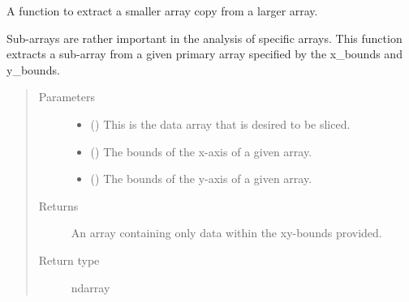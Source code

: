 \documentclass[letterpaper,10pt,english]{sphinxmanual}
\begin{document}
\begin{fulllineitems}
\label{\detokenize{python_docstrings/IfA_Smeargle.meta.fits_and_arrays:IfA_Smeargle.meta.fits_and_arrays.smeargle_extract_subarray}}
A function to extract a smaller array copy from a larger array.

Sub-arrays are rather important in the analysis of specific arrays.
This function extracts a sub-array from a given primary array specified
by the x\_bounds and y\_bounds.
\begin{quote}\begin{description}
\item[{Parameters}] \leavevmode\begin{itemize}
\item {} 
 () \textendash{} This is the data array that is desired to be sliced.

\item {} 
 () \textendash{} The bounds of the x-axis of a given array.

\item {} 
 () \textendash{} The bounds of the y-axis of a given array.

\end{itemize}

\item[{Returns}] \leavevmode
{} \textendash{} An array containing only data within the xy-bounds provided.

\item[{Return type}] \leavevmode
ndarray

\end{description}\end{quote}

\end{fulllineitems}

\end{document}

